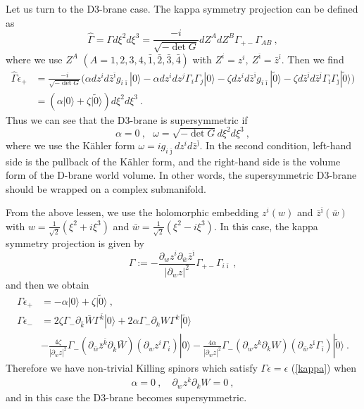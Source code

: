 \documentclass[a4paper,12pt]{article}
\numberwithin{equation}{section}
\newcommand{\del}{\partial}
\newcommand{\ib}{\bar{\imath}}
\newcommand{\jb}{\bar{\jmath}}
\newcommand{\kb}{\bar{k}}
\newcommand{\wb}{\bar{w}}
\newcommand{\zb}{\bar{z}}
\newcommand{\vac}{|0\rangle}
\newcommand{\vact}{|\tilde 0\rangle}
\newcommand{\nn}{\nonumber\\}
\begin{document}
Let us turn to the D3-brane case.
The kappa symmetry projection can be defined as
\begin{equation}
 \hat{\Gamma} = 
 \Gamma d \xi^2 d \xi^3 =  \frac{- i}{\sqrt{- \det G}} 
  d Z^A d Z^B \Gamma_{+-} \Gamma_{AB} ~,
\end{equation}
where we use  
$Z^{A}$ $(A=1,2,3,4,\bar 1,\bar 2,\bar 3,\bar 4)$ with
$Z^{i}=z^{i},\ Z^{\ib}=\zb^{\ib}$.
Then we find
\begin{align}
 \hat{\Gamma} \epsilon_+ &= \frac{- i}{\sqrt{- \det G}} \bigl(
    \alpha d z^i d \bar{z}^{\ib} g_{i \ib} \vac 
   - \alpha d z^i d z^j \Gamma_i \Gamma_j \vac 
   - \zeta d z^i d \bar{z}^{\ib} g_{i \ib} \vact 
   - \zeta d \bar{z}^{\ib} d \bar{z}^{\jb} \Gamma_{\ib} \Gamma_{\jb} \vact 
   \bigr) \nn 
   &= (\alpha \vac + \zeta \vact )d \xi^2 d \xi^3 ~.
\end{align}
Thus we can see that the D3-brane is supersymmetric if
\begin{equation}
 \alpha = 0~,~~~ \omega = \sqrt{- \det G}d \xi^2 d \xi^3 ~,
\end{equation}
where we use the K\"{a}hler form $\omega=ig_{i\jb}dz^{i}d\zb^{\jb}$.
In the second condition, left-hand side is the pullback of the K\"ahler form,
and the right-hand side is the volume form of the D-brane world volume.
In other words, the supersymmetric D3-brane should be wrapped on a complex
submanifold.
  
{}From the above lessen, we use the holomorphic embedding $z^i(w)$ and 
$\bar{z}^{\ib}(\bar{w})$ with 
$w=\frac{1}{\sqrt{2}}(\xi^2 + i  \xi^3)$  and
$\bar{w}=\frac{1}{\sqrt{2}}(\xi^2 - i \xi^3)$.
In this case, the kappa symmetry projection is given by
\begin{equation}
 \Gamma:=- \frac{\del_{w}z^{i}\del_{\wb}\zb^{\ib}}{|\del_{w}z |^2}
   \Gamma_{+-}\Gamma_{i\ib}~,
\label{D3projection}
\end{equation}
and then we obtain
\begin{align}
 \Gamma \epsilon_{+}&= - \alpha \vac + \zeta \vact~,\nn
 \Gamma \epsilon_{-}&=  2 \zeta \Gamma_{-} \del_{\kb} 
    \bar W \Gamma^{\kb}\vac
      + 2 \alpha \Gamma_{-} \del_{k} W \Gamma^{k} \vact\nn
   &-\frac{4 \zeta}{|\del_w z|^2}\Gamma_{-}
    (\del_{\wb}\zb^{\kb}\del_{\kb}\bar W)(\del_{w}z^{i}\Gamma_{i})\vac
  - \frac{4 \alpha}{|\del_w z|^2}\Gamma_{-}
    (\del_{w}z^{k}\del_{k} W)(\del_{\wb}z^{\ib}\Gamma_{\ib})\vact~.
\label{D3e-}
\end{align}
Therefore we have non-trivial Killing spinors 
which satisfy $\Gamma \epsilon = \epsilon$ (\ref{kappa}) when
\begin{eqnarray}
\alpha=0~,\quad \del_{w}z^{k}\del_{k} W=0 ~,
\label{D3cond}
\end{eqnarray}
and in this case the D3-brane becomes supersymmetric.
\end{document}
